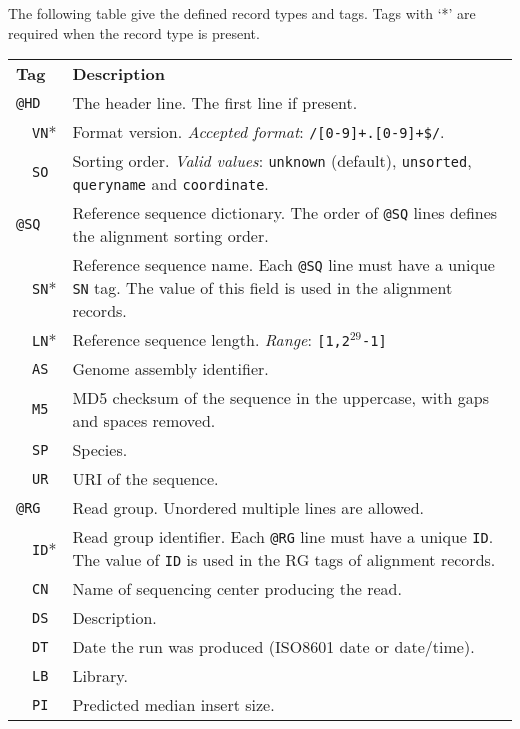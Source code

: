 \documentclass[10pt]{article}
\begin{document}
The following table give the defined record types and tags. Tags with
`*' are required when the record type is present.
\begin{center}
\small
\begin{longtable}{|l|l|p{13.5cm}|}
  \cline{1-3}
  \multicolumn{2}{|l|}{\bf Tag} & {\bf Description} \\
  \cline{1-3}
  \multicolumn{2}{|l}{\tt @HD} & The header line. The first line if present. \\\cline{2-3}
  & {\tt VN}* & Format version. \emph{Accepted format}: {\tt /\char94[0-9]+\char92.[0-9]+\$/}.\\\cline{2-3}
  & {\tt SO} & Sorting order. \emph{Valid values}: {\tt unknown} (default), {\tt unsorted}, {\tt queryname} and {\tt coordinate}. \\\cline{1-3}
  \multicolumn{2}{|l}{\tt @SQ} & Reference sequence dictionary. The order of {\tt @SQ} lines defines the alignment sorting order.\\\cline{2-3}
  & {\tt SN}* & Reference sequence name. Each {\tt @SQ} line must have a unique {\tt SN} tag. The value of this
  field is used in the
  alignment records. \\\cline{2-3}
  & {\tt LN}* & Reference sequence length. \emph{Range}: {\tt [1,2$^{29}$-1]}\\\cline{2-3}
  & {\tt AS} & Genome assembly identifier. \\\cline{2-3}
  & {\tt M5} & MD5 checksum of the sequence in the uppercase, with gaps and spaces removed.\\\cline{2-3}
  & {\tt SP} & Species.\\\cline{2-3}
  & {\tt UR} & URI of the sequence.\\\cline{1-3}
  \multicolumn{2}{|l}{\tt @RG} & Read group. Unordered multiple lines are allowed.\\\cline{2-3}
  & {\tt ID}* & Read group identifier. Each {\tt @RG} line must have a unique {\tt ID}. The value of {\tt ID}
  is used in the RG tags of alignment records. \\\cline{2-3}
  & {\tt CN} & Name of sequencing center producing the read.\\\cline{2-3}
  & {\tt DS} & Description.\\\cline{2-3}
  & {\tt DT} & Date the run was produced (ISO8601 date or date/time).\\\cline{2-3}
  & {\tt LB} & Library.\\\cline{2-3}
  & {\tt PI} & Predicted median insert size.\\\cline{2-3}

\end{longtable}
\end{center}
\end{document}
